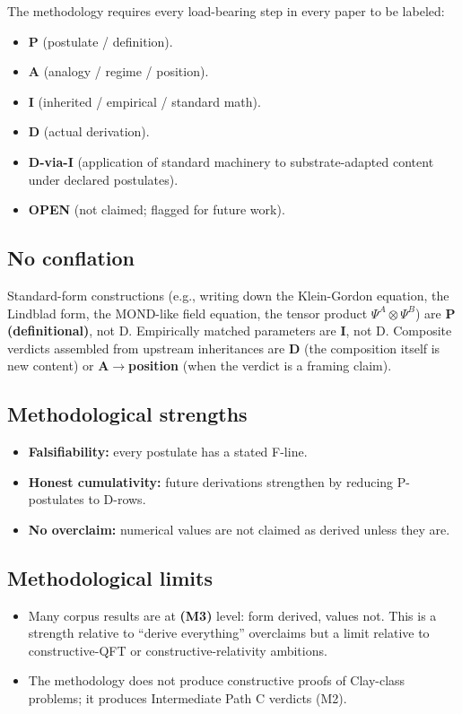\documentclass[11pt,a4paper]{article}
\begin{document}
The methodology requires every load-bearing step in every paper to be labeled:
\begin{itemize}[noitemsep]
\item \textbf{P} (postulate / definition).
\item \textbf{A} (analogy / regime / position).
\item \textbf{I} (inherited / empirical / standard math).
\item \textbf{D} (actual derivation).
\item \textbf{D-via-I} (application of standard machinery to substrate-adapted content under declared postulates).
\item \textbf{OPEN} (not claimed; flagged for future work).
\end{itemize}

\subsection{No conflation}

Standard-form constructions (e.g., writing down the Klein-Gordon equation, the Lindblad form, the MOND-like field equation, the tensor product $\Psi^A \otimes \Psi^B$) are \textbf{P (definitional)}, not D. Empirically matched parameters are \textbf{I}, not D. Composite verdicts assembled from upstream inheritances are \textbf{D} (the composition itself is new content) or \textbf{A$\to$position} (when the verdict is a framing claim).

\subsection{Methodological strengths}

\begin{itemize}[noitemsep]
\item \textbf{Falsifiability:} every postulate has a stated F-line.
\item \textbf{Honest cumulativity:} future derivations strengthen by reducing P-postulates to D-rows.
\item \textbf{No overclaim:} numerical values are not claimed as derived unless they are.
\end{itemize}

\subsection{Methodological limits}

\begin{itemize}[noitemsep]
\item Many corpus results are at \textbf{(M3)} level: form derived, values not. This is a strength relative to ``derive everything'' overclaims but a limit relative to constructive-QFT or constructive-relativity ambitions.
\item The methodology does not produce constructive proofs of Clay-class problems; it produces Intermediate Path C verdicts (M2).
\end{itemize}
\end{document}
